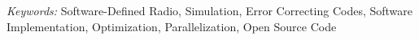 
\vskip0.5cm
\emph{Keywords:} Software-Defined Radio, Simulation, Error Correcting Codes,
                 Software Implementation, Optimization, Parallelization,
                 Open Source Code
